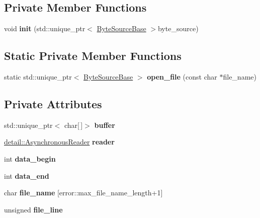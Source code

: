 \subsection*{Private Member Functions}
\begin{DoxyCompactItemize}
\item 
\mbox{\label{classio_1_1LineReader_a68ac92cedd46d25cbc4e205eb3a2833f}} 
void {\bfseries init} (std\+::unique\+\_\+ptr$<$ \hyperlink{classio_1_1ByteSourceBase}{Byte\+Source\+Base} $>$byte\+\_\+source)
\end{DoxyCompactItemize}
\subsection*{Static Private Member Functions}
\begin{DoxyCompactItemize}
\item 
\mbox{\label{classio_1_1LineReader_a036adce726096bca1db7ccceea938595}} 
static std\+::unique\+\_\+ptr$<$ \hyperlink{classio_1_1ByteSourceBase}{Byte\+Source\+Base} $>$ {\bfseries open\+\_\+file} (const char $\ast$file\+\_\+name)
\end{DoxyCompactItemize}
\subsection*{Private Attributes}
\begin{DoxyCompactItemize}
\item 
\mbox{\label{classio_1_1LineReader_afd45c8f7175a4094a469f5764816d181}} 
std\+::unique\+\_\+ptr$<$ char\mbox{[}$\,$\mbox{]}$>$ {\bfseries buffer}
\item 
\mbox{\label{classio_1_1LineReader_abfd04ef491b6515a26b1b17aab9430b0}} 
\hyperlink{classio_1_1detail_1_1AsynchronousReader}{detail\+::\+Asynchronous\+Reader} {\bfseries reader}
\item 
\mbox{\label{classio_1_1LineReader_a20676a014d14bfa566591d8cfeed0f29}} 
int {\bfseries data\+\_\+begin}
\item 
\mbox{\label{classio_1_1LineReader_a16829b470aa908981d4799401d42a85b}} 
int {\bfseries data\+\_\+end}
\item 
\mbox{\label{classio_1_1LineReader_a8b853ac45c1eae0afc36d49630e949d8}} 
char {\bfseries file\+\_\+name} \mbox{[}error\+::max\+\_\+file\+\_\+name\+\_\+length+1\mbox{]}
\item 
\mbox{\label{classio_1_1LineReader_a5c29ad60208bca6475af54e54eff80b7}} 
unsigned {\bfseries file\+\_\+line}
\end{DoxyCompactItemize}
